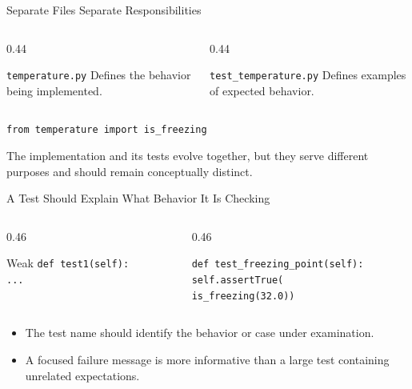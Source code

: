 \documentclass[aspectratio=169,10pt]{beamer}
\begin{document}
\begin{frame}{Separate Files Separate Responsibilities}
  \begin{columns}[T,onlytextwidth]
    \begin{column}{0.44\textwidth}
      \begin{block}{\texttt{temperature.py}}
        Defines the behavior being implemented.
      \end{block}
    \end{column}
    \begin{column}{0.44\textwidth}
      \begin{block}{\texttt{test\_temperature.py}}
        Defines examples of expected behavior.
      \end{block}
    \end{column}
  \end{columns}

  \begin{center}
    \texttt{from temperature import is\_freezing}
  \end{center}

  \begin{keyidea}
    The implementation and its tests evolve together, but they serve different purposes and should remain conceptually distinct.
  \end{keyidea}
\end{frame}

\begin{frame}{A Test Should Explain What Behavior It Is Checking}
  \begin{columns}[T,onlytextwidth]
    \begin{column}{0.46\textwidth}
      \begin{alertblock}{Weak}
        \texttt{def test1(self):}\\
        \hspace*{0.20in}\texttt{...}
      \end{alertblock}
    \end{column}
    \begin{column}{0.46\textwidth}
      \begin{exampleblockcp}
        \texttt{def test\_freezing\_point(self):}\\
        \hspace*{0.20in}\texttt{self.assertTrue(}\\
        \hspace*{0.40in}\texttt{is\_freezing(32.0))}
      \end{exampleblockcp}
    \end{column}
  \end{columns}

  \begin{itemize}
    \item The test name should identify the behavior or case under examination.
    \item A focused failure message is more informative than a large test containing unrelated expectations.
  \end{itemize}
\end{frame}
\end{document}
